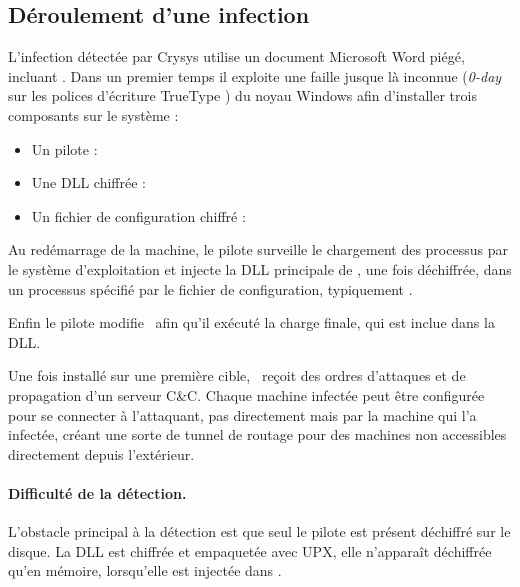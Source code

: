 \subsection{Déroulement d'une infection}
L'infection détectée par Crysys utilise un document Microsoft Word piégé, incluant \duqu.
Dans un premier temps il exploite une faille jusque là inconnue (\emph{0-day} sur les polices d'écriture TrueType \cite{CVETrueType}) du noyau Windows afin d'installer trois composants sur le système :
\begin{itemize}
 \item Un pilote : \driver
 \item Une DLL chiffrée : \netpDLL
 \item Un fichier de configuration chiffré : \netpCONF
\end{itemize}

Au redémarrage de la machine, le pilote surveille le chargement des processus par le système d'exploitation et injecte la DLL principale de \duqu, une fois déchiffrée, dans un processus spécifié par le fichier de configuration, typiquement \services.

Enfin le pilote modifie \services\ afin qu'il exécuté la charge finale, qui est inclue dans la DLL.

Une fois installé sur une première cible, \duqu\ reçoit des ordres d'attaques et de propagation d'un serveur C\&C.
Chaque machine infectée peut être configurée pour se connecter à l'attaquant, pas directement mais par la machine qui l'a infectée, créant une sorte de tunnel de routage pour des machines non accessibles directement depuis l'extérieur.


\paragraph{Difficulté de la détection.}
L'obstacle principal à la détection est que seul le pilote est présent déchiffré sur le disque.
La DLL est chiffrée et empaquetée avec UPX, elle n'apparaît déchiffrée qu'en mémoire, lorsqu'elle est injectée dans \services.

